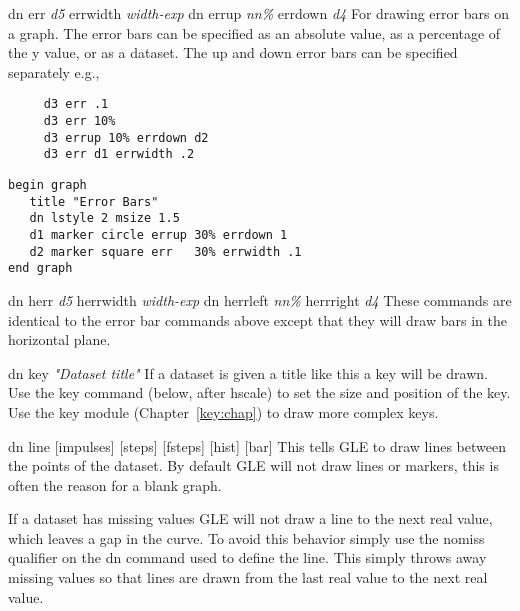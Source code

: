 \begin{commanddescription}
\item[{\sf dn err {\it d5} errwidth {\it width-exp} dn errup {\it nn\%} errdown {\it d4}} ]
   
For drawing error bars on a graph. The error bars can be specified as
an absolute value, as a percentage of the y value, or as a dataset.
The up and down error bars can be specified separately e.g.,

\preglecode{}
\begin{Verbatim}
     d3 err .1
     d3 err 10%
     d3 errup 10% errdown d2
     d3 err d1 errwidth .2
\end{Verbatim}
\postglecode{}

\begin{minipage}[c]{8cm}
\begin{Verbatim}
begin graph
   title "Error Bars"
   dn lstyle 2 msize 1.5
   d1 marker circle errup 30% errdown 1
   d2 marker square err   30% errwidth .1
end graph
\end{Verbatim}
\end{minipage}
\hfill
\begin{minipage}[c]{7cm}
\mbox{}
\end{minipage}

\item[{\sf dn herr {\it d5} herrwidth {\it width-exp} dn herrleft {\it nn\%} herrright {\it d4}} ]
   
These commands are identical to the error bar commands above except that
they will draw bars in the horizontal plane.

\item[{\sf dn key {\it "Dataset title"}}  ]
If a dataset is given a title like this a key will be drawn.  Use the
{\sf key} command (below, after hscale) to set the size and
position of the key.  Use the key module (Chapter~\ref{key:chap}) to draw
more complex keys.

\item[{\sf dn line [impulses] [steps] [fsteps] [hist] [bar]}]
This tells GLE to draw lines between the points of the dataset.  By
default GLE will not draw lines or markers, this is often the reason
for a blank graph.

If a dataset has missing values GLE will not draw a line to the next
real value, which leaves a gap in the curve.  To avoid this
behavior simply use the {\sf nomiss} qualifier on the {\sf dn} command
used to define the line. This simply throws away missing values so that
lines are drawn from the last real value to the next real value.


\end{commanddescription}
